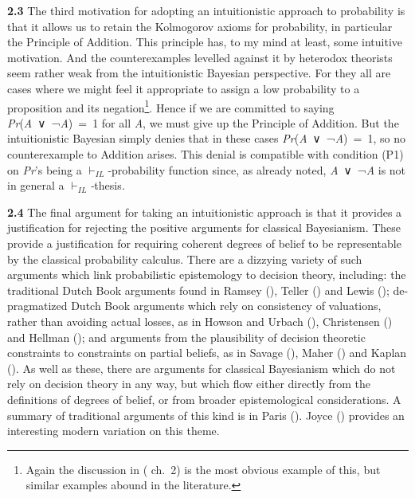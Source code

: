 \documentclass[
  10pt,
  letterpaper,
  DIV=11,
  numbers=noendperiod,
  twoside]{scrartcl}
\begin{document}
\textbf{2.3} The third motivation for adopting an intuitionistic
approach to probability is that it allows us to retain the Kolmogorov
axioms for probability, in particular the Principle of Addition. This
principle has, to my mind at least, some intuitive motivation. And the
counterexamples levelled against it by heterodox theorists seem rather
weak from the intuitionistic Bayesian perspective. For they all are
cases where we might feel it appropriate to assign a low probability to
a proposition and its negation\footnote{Again the discussion in
  ( ch.~2) is the most obvious
  example of this, but similar examples abound in the literature.}.
Hence if we are committed to saying \emph{Pr}(\emph{A}~∨~¬\emph{A})~=~1
for all \emph{A}, we must give up the Principle of Addition. But the
intuitionistic Bayesian simply denies that in these cases
\emph{Pr}(\emph{A}~∨~¬\emph{A})~=~1, so no counterexample to Addition
arises. This denial is compatible with condition (P1) on \emph{Pr}'s
being a \(\vdash_{IL}\)-probability function since, as already noted,
\emph{A}~∨~¬\emph{A} is not in general a
\(\vdash_{IL}\)\emph{-}thesis\emph{.}

\textbf{2.4} The final argument for taking an intuitionistic approach is
that it provides a justification for rejecting the positive arguments
for classical Bayesianism. These provide a justification for requiring
coherent degrees of belief to be representable by the classical
probability calculus. There are a dizzying variety of such arguments
which link probabilistic epistemology to decision theory, including: the
traditional Dutch Book arguments found in Ramsey
(), Teller
() and Lewis
(); de-pragmatized Dutch Book arguments
which rely on consistency of valuations, rather than avoiding actual
losses, as in Howson and Urbach (),
Christensen () and Hellman
(); and arguments from the plausibility
of decision theoretic constraints to constraints on partial beliefs, as
in Savage (), Maher
() and Kaplan
(). As well as these, there are arguments
for classical Bayesianism which do not rely on decision theory in any
way, but which flow either directly from the definitions of degrees of
belief, or from broader epistemological considerations. A summary of
traditional arguments of this kind is in Paris
(). Joyce ()
provides an interesting modern variation on this theme.
\end{document}
